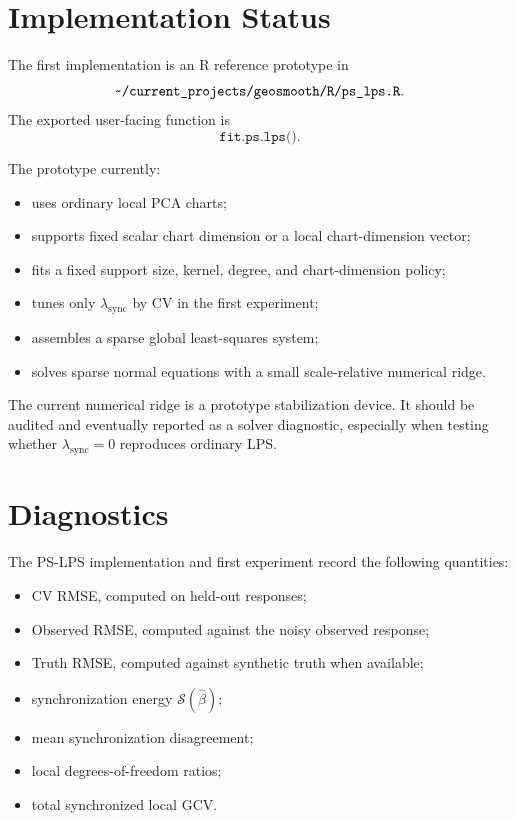 \documentclass[11pt]{article}
\begin{document}
\section{Implementation Status}

The first implementation is an R reference prototype in
\[
  \texttt{\string~/current\_projects/geosmooth/R/ps\_lps.R}.
\]
The exported user-facing function is
\[
  \texttt{fit.ps.lps()}.
\]

The prototype currently:
\begin{itemize}[leftmargin=*]
  \item uses ordinary local PCA charts;
  \item supports fixed scalar chart dimension or a local chart-dimension vector;
  \item fits a fixed support size, kernel, degree, and chart-dimension policy;
  \item tunes only \(\lambda_{\mathrm{sync}}\) by CV in the first experiment;
  \item assembles a sparse global least-squares system;
  \item solves sparse normal equations with a small scale-relative numerical
    ridge.
\end{itemize}

The current numerical ridge is a prototype stabilization device.  It should be
audited and eventually reported as a solver diagnostic, especially when testing
whether \(\lambda_{\mathrm{sync}}=0\) reproduces ordinary LPS.

\section{Diagnostics}

The PS-LPS implementation and first experiment record the following quantities:
\begin{itemize}[leftmargin=*]
  \item CV RMSE, computed on held-out responses;
  \item Observed RMSE, computed against the noisy observed response;
  \item Truth RMSE, computed against synthetic truth when available;
  \item synchronization energy \(\mathcal S(\widehat\beta)\);
  \item mean synchronization disagreement;
  \item local degrees-of-freedom ratios;
  \item total synchronized local GCV.
\end{itemize}
\end{document}
